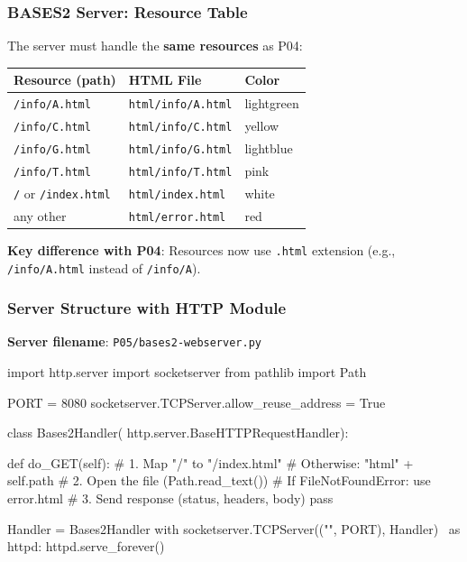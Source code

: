 \documentclass[xcolor=table]{beamer}
\begin{document}
\begin{frame}
\frametitle{BASES2 Server: Resource Table}

The server must handle the \textbf{same resources} as P04:

\vspace{0.2cm}

\begingroup\small
\begin{center}
\begin{tabular}{|l|l|l|}
\hline
\textbf{Resource (path)} & \textbf{HTML File} & \textbf{Color} \\
\hline
\texttt{/info/A.html} & \texttt{html/info/A.html} & lightgreen \\
\hline
\texttt{/info/C.html} & \texttt{html/info/C.html} & yellow \\
\hline
\texttt{/info/G.html} & \texttt{html/info/G.html} & lightblue \\
\hline
\texttt{/info/T.html} & \texttt{html/info/T.html} & pink \\
\hline
\texttt{/} or \texttt{/index.html} & \texttt{html/index.html} & white \\
\hline
any other & \texttt{html/error.html} & red \\
\hline
\end{tabular}
\end{center}
\endgroup

\vspace{0.2cm}

\textbf{Key difference with P04}: Resources now use \texttt{.html} extension (e.g., \texttt{/info/A.html} instead of \texttt{/info/A}).

\end{frame}

\begin{frame}[fragile]
\frametitle{Server Structure with HTTP Module}

\textbf{Server filename}: \texttt{P05/bases2-webserver.py}

\vspace{0.1cm}

\begin{python}
import http.server
import socketserver
from pathlib import Path

PORT = 8080
socketserver.TCPServer.allow_reuse_address = True

class Bases2Handler(
        http.server.BaseHTTPRequestHandler):

    def do_GET(self):
        # 1. Map "/" to "/index.html"
        #    Otherwise: "html" + self.path
        # 2. Open the file (Path.read_text())
        #    If FileNotFoundError: use error.html
        # 3. Send response (status, headers, body)
        pass

Handler = Bases2Handler
with socketserver.TCPServer(("", PORT), Handler) \
        as httpd:
    httpd.serve_forever()
\end{python}

\end{frame}
\end{document}
